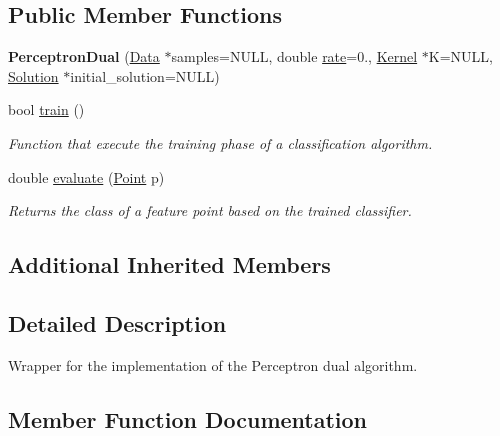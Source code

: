 \subsection*{Public Member Functions}
\begin{DoxyCompactItemize}
\item 
\mbox{\label{class_perceptron_dual_a77604012ef519c2f4e0e32bc8387b459}} 
{\bfseries Perceptron\+Dual} (\hyperlink{class_data}{Data} $\ast$samples=N\+U\+LL, double \hyperlink{class_classifier_af9867e5919742de1303dd971a9a1c19a}{rate}=0., \hyperlink{class_kernel}{Kernel} $\ast$K=N\+U\+LL, \hyperlink{class_solution}{Solution} $\ast$initial\+\_\+solution=N\+U\+LL)
\item 
bool \hyperlink{class_perceptron_dual_a91b0bd1e86a6003b57b96199266cdc3e}{train} ()
\begin{DoxyCompactList}\small\item\em Function that execute the training phase of a classification algorithm. \end{DoxyCompactList}\item 
double \hyperlink{class_perceptron_dual_a3ed5554b85b4b1ec98f57acab3eeeaca}{evaluate} (\hyperlink{class_point}{Point} p)
\begin{DoxyCompactList}\small\item\em Returns the class of a feature point based on the trained classifier. \end{DoxyCompactList}\end{DoxyCompactItemize}
\subsection*{Additional Inherited Members}


\subsection{Detailed Description}
Wrapper for the implementation of the Perceptron dual algorithm. 

\subsection{Member Function Documentation}
\mbox{\label{class_perceptron_dual_a3ed5554b85b4b1ec98f57acab3eeeaca}} 
